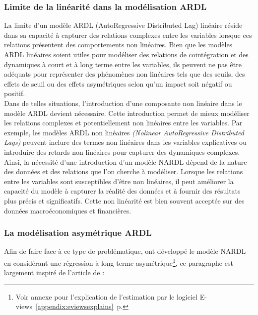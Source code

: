 \begin{sloppypar}
\subsubsection{Limite de la linéarité dans la modélisation ARDL}

La limite d'un modèle ARDL (AutoRegressive Distributed Lag) linéaire réside dans sa capacité à capturer des relations complexes entre les variables lorsque ces relations présentent des comportements non linéaires. Bien que les modèles ARDL linéaires soient utiles pour modéliser des relations de cointégration et des dynamiques à court et à long terme entre les variables, ils peuvent ne pas être adéquats pour représenter des phénomènes non linéaires tels que des seuils, des effets de seuil ou des effets asymétriques selon qu'un impact soit négatif ou positif.\\

Dans de telles situations, l'introduction d'une composante non linéaire dans le modèle ARDL devient nécessaire. Cette introduction permet de mieux modéliser les relations complexes et potentiellement non linéaires entre les variables. Par exemple, les modèles ARDL non linéaires \textit{(Nolinear AutoRegressive Distributed Lags)} peuvent inclure des termes non linéaires dans les variables explicatives ou introduire des retards non linéaires pour capturer des dynamiques complexes.\\

Ainsi, la nécessité d'une introduction d'un modèle NARDL dépend de la nature des données et des relations que l'on cherche à modéliser. Lorsque les relations entre les variables sont susceptibles d'être non linéaires, il peut améliorer la capacité du modèle à capturer la réalité des données et à fournir des résultats plus précis et significatifs. Cette non linéarité est bien souvent acceptée sur des données macroéconomiques et financières.\\

\subsubsection{La modélisation asymétrique ARDL}

Afin de faire face à ce type de problématique, \cite{Shin} ont développé le modèle NARDL en considérant une régression à long terme asymétrique\footnote{Voir annexe pour l'explication de l'estimation par le logiciel E-views~\ref{appendix:eviewsexplains}~p.\pageref{appendix:eviewsexplains}}, ce paragraphe est largement inspiré de l'article de \cite{Allen et McAleer} :


\end{sloppypar}

